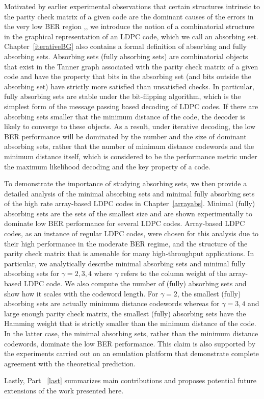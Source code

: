 Motivated by earlier experimental observations that certain
structures intrinsic to the parity check matrix of a given code are
the dominant causes of the errors in the very low BER region
\cite{richardson},\cite{zhang06}, we introduce the notion of a
combinatorial structure in the graphical representation of an LDPC
code, which we call an absorbing set. Chapter~\ref{iterativeBG} also
contains a formal definition of absorbing and fully absorbing sets.
Absorbing sets (fully absorbing sets) are combinatorial objects that
exist in the Tanner graph associated with the parity check matrix of
a given code and have the property that bits in the absorbing set
(and bits outside the absorbing set) have strictly more satisfied
than unsatisfied checks. In particular, fully absorbing sets are
stable under the bit-flipping algorithm, which is the simplest form
of the message passing based decoding of LDPC codes. If there are
absorbing sets smaller that the minimum distance of the code, the
decoder is likely to converge to these objects. As a result, under
iterative decoding, the low BER performance will be dominated by the
number and the size of dominant absorbing sets, rather that the
number of minimum distance codewords and the minimum distance
itself, which is considered to be the performance metric under the
maximum likelihood decoding and the key property of a code.

To demonstrate the importance of studying absorbing sets, we then
provide a detailed analysis of the  minimal absorbing sets and
minimal fully absorbing sets of the high rate array-based LDPC codes
in Chapter~\ref{arrayabs}. Minimal (fully) absorbing sets are the
sets of the smallest size and  are shown experimentally to dominate
low BER performance for several LDPC codes. Array-based LDPC codes,
as an instance of regular LDPC codes, were chosen for this analysis
due to their high performance in the moderate BER regime, and the
structure of the parity check matrix that is amenable for many
high-throughput applications. In particular, we analytically
describe minimal absorbing sets and minimal fully absorbing sets for
 $\gamma=2,3,4$  where $\gamma$ refers to the column
weight of the array-based LDPC code. We also compute the number of
(fully) absorbing sets and show how it scales with the codeword
length. For $\gamma=2$, the smallest (fully) absorbing sets are
actually minimum distance codewords whereas for $\gamma =3,4$ and
large enough parity check matrix, the smallest (fully) absorbing
sets have the Hamming weight that is strictly smaller than the
minimum distance of the code. In the latter case, the minimal
absorbing sets, rather than the minimum distance codewords, dominate
the low BER performance. This claim is also supported by the
experiments carried out on an emulation platform that demonstrate
complete agreement with the theoretical prediction.

Lastly, Part ~\ref{last} summarizes main contributions and proposes
potential future extensions of the work presented here.
